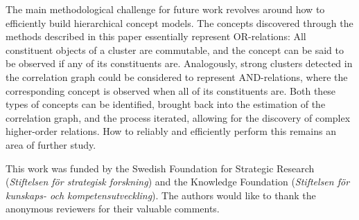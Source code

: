 \documentclass{kais}
\begin{document}
The main methodological challenge for future work revolves around how to efficiently build hierarchical concept models.
The concepts discovered through the methods described in this paper essentially represent OR-relations: All constituent
objects of a cluster are commutable, and the concept can be said to be observed if any of its constituents
are. Analogously, strong clusters detected in the correlation graph could be considered to represent AND-relations,
where the corresponding concept is observed when all of its constituents are. Both these types of
concepts can be identified, brought back into the estimation of the correlation graph, and the process
iterated, allowing for the discovery of complex higher-order relations. How to reliably and efficiently perform this
remains an area of further study.

\begin{acknowledgements}
This work was funded by the Swedish Foundation for Strategic Research (\emph{Stiftelsen f\"or strategisk forskning}) 
and the Knowledge Foundation (\emph{Stiftelsen f\"or kunskaps- och kompetensutveckling}). 
The authors would like to thank the anonymous reviewers for their valuable comments.\end{acknowledgements}
\end{document}
